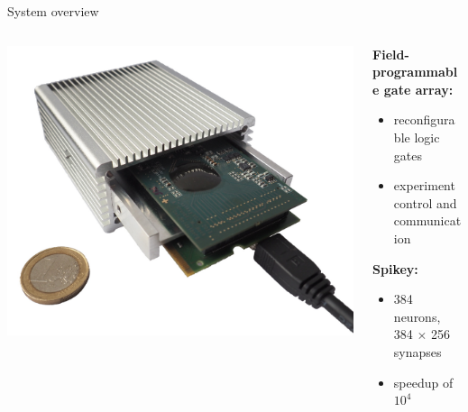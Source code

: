 \documentclass[aspectratio=169]{beamer}
\begin{document}
\begin{frame}{System overview}
	\begin{columns}[onlytextwidth]
		\begin{column}{0.40\textwidth}
			\includegraphics[width=\textwidth]{assets/spikey_system.png}
			\vspace{2ex}
			\begin{center}
			\end{center}
		\end{column}
		\hfill
		\begin{column}{0.50\textwidth}

			\textbf{Field-programmable gate array:}
			\begin{itemize}
				\item reconfigurable logic gates
				\item experiment control and communication
			\end{itemize}

			\vspace{3ex}

			\textbf{Spikey:}
			\begin{itemize}
				\item 384 neurons, 384 $\times$ 256 synapses
				\item speedup of $10^4$
			\end{itemize}
		\end{column}
	\end{columns}
\end{frame}
\end{document}
